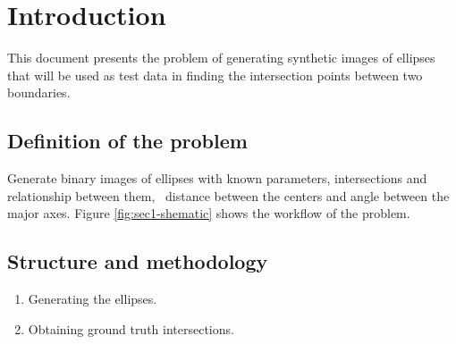 \section{Introduction}
This document presents the problem of generating synthetic images of
ellipses that will be used as test data in finding the intersection
points between two boundaries. 

\subsection{Definition of the problem}
Generate binary images of ellipses with known parameters,
intersections and relationship between them, \ie\ distance between the
centers and angle between the major axes. Figure
\ref{fig:sec1-shematic} shows the workflow of the problem.


\subsection{Structure and methodology}
\begin{enumerate}
\item Generating the ellipses.
\item Obtaining ground truth intersections.
\end{enumerate}